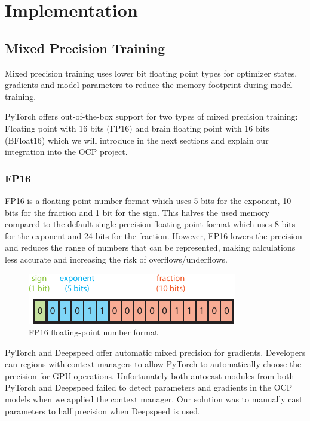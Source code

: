 \section{Implementation}
\label{section:implementation}

\subsection{Mixed Precision Training}

Mixed precision training uses lower bit floating point types for optimizer states, gradients and model parameters to 
reduce the memory footprint during model training. 

PyTorch offers out-of-the-box support for two types of mixed precision training: Floating point with 16 bits (FP16) and 
brain floating point with 16 bits (BFloat16) which we will introduce in the next sections and explain our integration 
into the OCP project.

\subsubsection{FP16}

FP16 is a floating-point number format which uses 5 bits for the exponent, 10 bits for the fraction and 1 bit for the 
sign. This halves the used memory compared to the default single-precision floating-point format which uses 8 bits 
for the exponent and 24 bits for the fraction. However, FP16 lowers the precision and reduces the range of numbers 
that can be represented, making calculations less accurate and increasing the risk of overflows/underflows.

\begin{figure}[h]
    \centering
    \includegraphics{figures/mixed_precision/float16.pdf}
    \caption{FP16 floating-point number format}
\end{figure}

PyTorch and Deepspeed offer automatic mixed precision for gradients. Developers can regions with context managers 
to allow PyTorch to automatically choose the precision for GPU operations. Unfortunately both autocast modules from 
both PyTorch and Deepspeed failed to detect parameters and gradients in the OCP models when we applied the context 
manager. Our solution was to manually cast parameters to half precision when Deepspeed is used. 

